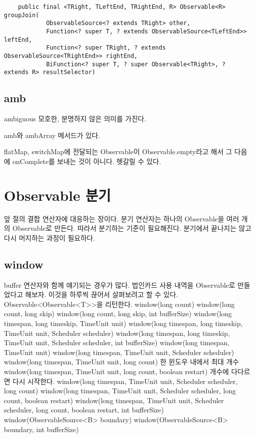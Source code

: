 \documentclass{book}
\begin{document}
{\begin{verbatim}
    public final <TRight, TLeftEnd, TRightEnd, R> Observable<R> groupJoin(
            ObservableSource<? extends TRight> other,
            Function<? super T, ? extends ObservableSource<TLeftEnd>> leftEnd,
            Function<? super TRight, ? extends ObservableSource<TRightEnd>> rightEnd,
            BiFunction<? super T, ? super Observable<TRight>, ? extends R> resultSelector) 
\end{verbatim}
\subsection{amb}
ambiguous
모호한, 분명하지 않은 의미를 가진다.

amb와 ambArray 메서드가 있다.

flatMap, switchMap에 전달되는 Observable이 Observable.empty라고 해서 그 다음에 onComplete를 보내는 것이 아니다. 헷갈릴 수 있다.

\section{Observable 분기}
앞 절의 결합 연산자에 대응하는 장이다. 
분기 연산자는 하나의 Observable을 여러 개의 Observable로 만든다.
따라서 분기하는 기준이 필요해진다.
분기에서 끝나지는 않고 다시 머지하는 과정이 필요하다.

\subsection{window}
buffer 연산자와 함께 얘기되는 경우가 많다.
법인카드 사용 내역을 Observable로 만들었다고 해보자.
이것을 하루씩 끊어서 살펴보려고 할 수 있다. 
Observable<Observable<T>>을 리턴한다.
window(long count)
window(long count, long skip)
window(long count, long skip, int bufferSize)
window(long timespan, long timeskip, TimeUnit unit)
window(long timespan, long timeskip, TimeUnit unit, Scheduler scheduler)
window(long timespan, long timeskip, TimeUnit unit, Scheduler scheduler, int bufferSize)
window(long timespan, TimeUnit unit)
window(long timespan, TimeUnit unit, Scheduler scheduler)
window(long timespan, TimeUnit unit, long count)
한 윈도우 내에서 최대 개수
window(long timespan, TimeUnit unit, long count, boolean restart)
개수에 다다르면 다시 시작한다.
window(long timespan, TimeUnit unit,
            Scheduler scheduler, long count)
window(long timespan, TimeUnit unit,
            Scheduler scheduler, long count, boolean restart)
window(long timespan, TimeUnit unit, Scheduler scheduler,
            long count, boolean restart, int bufferSize)
window(ObservableSource<B> boundary)
window(ObservableSource<B> boundary, int bufferSize)
            
}
\end{document}
